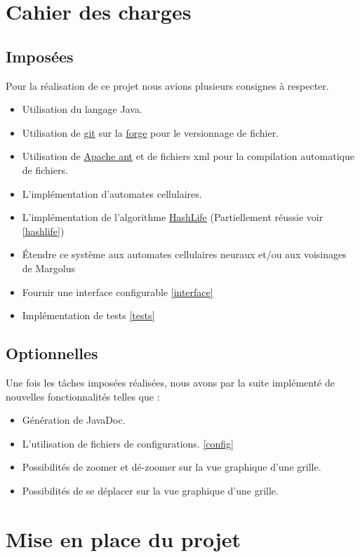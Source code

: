 \documentclass[12pt]{article}
\begin{document}
	
	\section{Cahier des charges}
		\subsection{Imposées}
			Pour la réalisation de ce projet nous avions plusieurs consignes à respecter.
			\begin{itemize}[label=\textbullet]
				\item Utilisation du langage Java.
				\item Utilisation de \href{https://git-scm.com/}{git} sur la \href{https://forge.info.unicaen.fr/}{forge} pour le versionnage de fichier.
				\item Utilisation de \href{https://ant.apache.org/}{Apache ant} et de fichiers xml pour la compilation automatique de fichiers.
				\item L'implémentation d'automates cellulaires.
				\item L'implémentation de l'algorithme  \href{https://en.wikipedia.org/wiki/Hashlife}{HashLife} (Partiellement réussie voir \ref{hashlife})
				\item Étendre ce système aux automates cellulaires neuraux et/ou aux voisinages de Margolus
				\item Fournir une interface configurable \ref{interface}
				\item Implémentation de tests	\ref{tests}
			\end{itemize}
		
		\subsection{Optionnelles}
			Une fois les tâches imposées réalisées, nous avons par la suite implémenté de nouvelles fonctionnalités telles que : 
			\begin{itemize}[label=\textbullet]
				\item Génération de JavaDoc.
				\item L'utilisation de fichiers de configurations. \ref{config}
				\item Possibilités de zoomer et dé-zoomer sur la vue graphique d'une grille.
				\item Possibilités de se déplacer sur la vue graphique d'une grille.
			\end{itemize}
	
	
	\section{Mise en place du projet}
\end{document}
